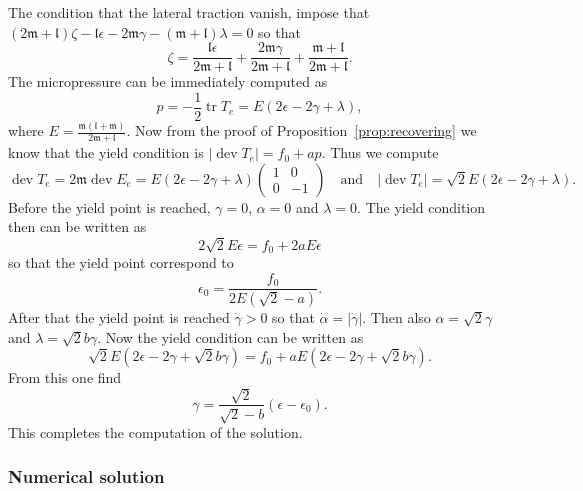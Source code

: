 \documentclass[a4paper,10pt,twoside]{amsbook}
\numberwithin{section}{chapter}
\numberwithin{equation}{chapter}
\theoremstyle{definition}
\DeclareMathOperator{\dev}{dev}
\DeclareMathOperator{\tr}{tr}
\begin{document}
The condition that the lateral traction vanish, impose that $(2\mathfrak{m}+\mathfrak{l})\zeta-\mathfrak{l}\epsilon-2\mathfrak{m}\gamma-(\mathfrak{m}+\mathfrak{l})\lambda=0$ so that
\[
\zeta=\frac{\mathfrak{l}\epsilon}{2\mathfrak{m}+\mathfrak{l}}+\frac{2\mathfrak{m}\gamma}{2\mathfrak{m}+\mathfrak{l}}+\frac{\mathfrak{m}+\mathfrak{l}}{2\mathfrak{m}+\mathfrak{l}}.
\]
The micropressure can be immediately computed as
\[
p=-\frac{1}{2}\tr T_e=E(2\epsilon-2\gamma+\lambda),
\]
where $E=\frac{\mathfrak{m}(\mathfrak{l}+\mathfrak{m})}{2\mathfrak{m}+\mathfrak{l}}$. Now from the proof of Proposition~\ref{prop:recovering} we know that the yield condition is $|\dev T_e|=f_0+ap$. Thus we compute
\[
\dev T_e=2\mathfrak{m}\dev E_e=
E(2\epsilon-2\gamma+\lambda)\begin{pmatrix}
1 & 0 \\
0 & -1
\end{pmatrix}\quad\text{and}\quad|\dev T_e|=\sqrt{2}E(2\epsilon-2\gamma+\lambda).
\]
Before the yield point is reached, $\gamma=0$, $\alpha=0$ and $\lambda=0$. The yield condition then can be written as
\[
2\sqrt{2}E\epsilon=f_0+2aE\epsilon
\]
so that the yield point correspond to
\[
\epsilon_0=\frac{f_0}{2E(\sqrt{2}-a)}.
\]
After that the yield point is reached $\dot\gamma>0$ so that $\dot\alpha=|\dot\gamma|$. Then also $\alpha=\sqrt{2}\gamma$ and $\lambda=\sqrt{2}b\gamma$. Now the yield condition can be written as
\[
\sqrt{2}E(2\epsilon-2\gamma+\sqrt{2}b\gamma)=f_0+aE(2\epsilon-2\gamma+\sqrt{2}b\gamma).
\]
From this one find
\[
\gamma=\frac{\sqrt{2}}{\sqrt{2}-b}(\epsilon-\epsilon_0).
\]
This completes the computation of the solution.

\subsubsection*{Numerical solution}
\end{document}
